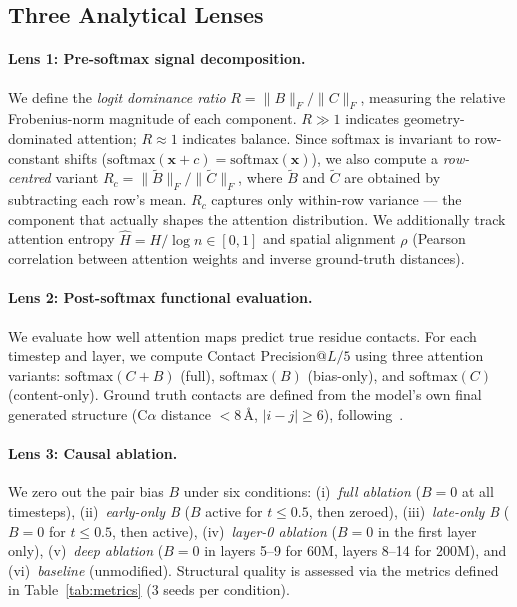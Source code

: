\documentclass{article}
\begin{document}
\subsection{Three Analytical Lenses}

\paragraph{Lens 1: Pre-softmax signal decomposition.}
We define the \emph{logit dominance ratio} $R = \|B\|_F / \|C\|_F$, measuring the relative Frobenius-norm magnitude of each component.
$R \gg 1$ indicates geometry-dominated attention; $R \approx 1$ indicates balance.
Since softmax is invariant to row-constant shifts ($\mathrm{softmax}(\mathbf{x} + c) = \mathrm{softmax}(\mathbf{x})$), we also compute a \emph{row-centred} variant $R_c = \|\tilde{B}\|_F / \|\tilde{C}\|_F$, where $\tilde{B}$ and $\tilde{C}$ are obtained by subtracting each row's mean.
$R_c$ captures only within-row variance --- the component that actually shapes the attention distribution.
We additionally track attention entropy $\hat{H} = H / \log n \in [0,1]$ and spatial alignment $\rho$ (Pearson correlation between attention weights and inverse ground-truth distances).

\paragraph{Lens 2: Post-softmax functional evaluation.}
We evaluate how well attention maps predict true residue contacts.
For each timestep and layer, we compute Contact Precision@$L/5$ using three attention variants: $\mathrm{softmax}(C + B)$ (full), $\mathrm{softmax}(B)$ (bias-only), and $\mathrm{softmax}(C)$ (content-only).
Ground truth contacts are defined from the model's own final generated structure (C$\alpha$ distance $< 8$\,\AA, $|i{-}j| \geq 6$), following~\citet{rao2020transformer}.

\paragraph{Lens 3: Causal ablation.}
We zero out the pair bias $B$ under six conditions: (i)~\emph{full ablation} ($B{=}0$ at all timesteps), (ii)~\emph{early-only B} ($B$ active for $t \leq 0.5$, then zeroed), (iii)~\emph{late-only B} ($B{=}0$ for $t \leq 0.5$, then active), (iv)~\emph{layer-0 ablation} ($B{=}0$ in the first layer only), (v)~\emph{deep ablation} ($B{=}0$ in layers 5--9 for 60M, layers 8--14 for 200M), and (vi)~\emph{baseline} (unmodified).
Structural quality is assessed via the metrics defined in Table~\ref{tab:metrics} (3 seeds per condition).
\end{document}

